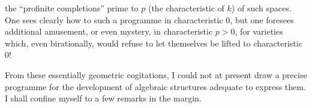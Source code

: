 %
the ``profinite completions''  prime to $p$ (the characteristic of $k$) of such spaces.
One sees clearly how to  such a programme in characteristic $0$, but one foresees additional amusement, or even mystery, in characteristic $p>0$, for varieties which, even birationally, would refuse to let themselves be lifted to characteristic $0$!


From these essentially geometric cogitations, I could not at present draw a precise programme for the development of algebraic structures adequate to express them.
I shall confine myself to a few remarks in the margin.

